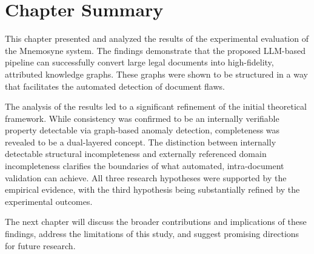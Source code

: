 \section{Chapter Summary}
\label{sec:results_summary}
This chapter presented and analyzed the results of the experimental evaluation of the Mnemosyne system. The findings demonstrate that the proposed LLM-based pipeline can successfully convert large legal documents into high-fidelity, attributed knowledge graphs. These graphs were shown to be structured in a way that facilitates the automated detection of document flaws.

The analysis of the results led to a significant refinement of the initial theoretical framework. While consistency was confirmed to be an internally verifiable property detectable via graph-based anomaly detection, completeness was revealed to be a dual-layered concept. The distinction between internally detectable structural incompleteness and externally referenced domain incompleteness clarifies the boundaries of what automated, intra-document validation can achieve. All three research hypotheses were supported by the empirical evidence, with the third hypothesis being substantially refined by the experimental outcomes.

The next chapter will discuss the broader contributions and implications of these findings, address the limitations of this study, and suggest promising directions for future research.